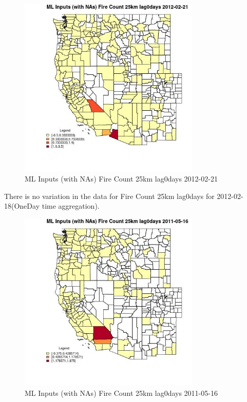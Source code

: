 \begin{figure} 
\centering  
\includegraphics[width=0.77\textwidth]{Code_Outputs/Report_ML_input_PM25_Step4_part_f_de_duplicated_aves_prioritize_24hr_obswNAs_CountyFire_Count_25km_lag0daysMean2012-02-21.jpg} 
\caption{\label{fig:Report_ML_input_PM25_Step4_part_f_de_duplicated_aves_prioritize_24hr_obswNAsCountyFire_Count_25km_lag0daysMean2012-02-21}ML Inputs (with NAs) Fire Count 25km lag0days 2012-02-21} 
\end{figure} 
 

There is no variation in the data for Fire Count 25km lag0days for 2012-02-18(OneDay time aggregation). 
 

\begin{figure} 
\centering  
\includegraphics[width=0.77\textwidth]{Code_Outputs/Report_ML_input_PM25_Step4_part_f_de_duplicated_aves_prioritize_24hr_obswNAs_CountyFire_Count_25km_lag0daysMean2011-05-16.jpg} 
\caption{\label{fig:Report_ML_input_PM25_Step4_part_f_de_duplicated_aves_prioritize_24hr_obswNAsCountyFire_Count_25km_lag0daysMean2011-05-16}ML Inputs (with NAs) Fire Count 25km lag0days 2011-05-16} 
\end{figure} 
 

